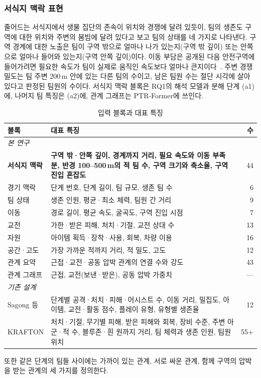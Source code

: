 \subsubsection{서식지 맥락 표현}
\label{sec:method:representation}
줄어드는 서식지에서 생물 집단의 존속이 위치와 경쟁에 달려 있듯이, 팀의 생존도 구역에 대한 위치와 주변의 붐빔에 달려 있다고 보고 팀의 상태를 네 가지로 나타낸다.
구역 경계에 대한 노출은 팀이 구역 밖으로 얼마나 나가 있는지(구역 밖 깊이) 또는 안쪽으로 얼마나 들어와 있는지(구역 안쪽 깊이)이다.
이동 부담은 공개된 다음 안전구역에 들어가려면 필요한 속도가 팀이 실제로 움직인 속도보다 얼마나 큰지이다~\cite{Nathan08}.
주변 경쟁 밀도는 팀 주변 200\,m 안에 있는 다른 팀의 수이고, 남은 팀원 수는 절단 시각에 살아 있다고 판정된 팀원의 수이다.
 서식지 맥락 블록은 RQ1의 해석 모델과 분해 단계 (a1)에, 나머지 팀 특징은 (a2)에, 관계 그래프는 PTR-Former에 쓰인다.

\begin{table}[t]
\centering
\caption{입력 블록과 대표 특징}
\label{tab:blocks}
\footnotesize
\setlength{\tabcolsep}{3pt}
\renewcommand{\arraystretch}{1.0}
\begin{tabular}{p{1.8cm}p{5.4cm}r}
\hline
블록 & 대표 특징 & 수 \\
\hline
\multicolumn{3}{l}{\emph{본 연구}} \\
\textbf{서식지 맥락} & \textbf{구역 밖·안쪽 깊이, 경계까지 거리, 필요 속도와 이동 부족분, 반경 100--500\,m의 적 팀 수, 구역 크기와 축소율, 구역 진입 혼잡도} & 44 \\
경기 맥락 & 단계 번호, 단계 길이, 팀 규모, 생존 팀 수 & 6 \\
팀 상태 & 생존 인원, 평균·최소 체력, 팀원 간 거리 & 9 \\
이동 & 경로 길이, 평균 속도, 굴곡도, 구역 진입 시점 & 7 \\
교전 & 가한·받은 피해, 처치·기절, 교전 상대 수 & 13 \\
자원 & 아이템 획득·장착·사용, 회복, 차량 이용 & 16 \\
공간·고도 & 가장 가까운 적까지 거리, 적 밀도, 고도 & 12 \\
관계 요약 & 근접·교전·공동 압박 관계의 연결 수와 강도 & 43 \\
관계 그래프 & 근접, 교전(보낸·받은), 공동 압박 가중치 & --- \\
\hline
\multicolumn{3}{l}{\emph{기존 설계}} \\
Sagong 등 & 단계별 공격·처치·피해·어시스트 수, 이동 거리, 밀집도, 아이템, 교전·활동 점수, 플레이 유형, 유형별 생존율 & 12 \\
KRAFTON & 처치·기절, 무기별 피해, 받은 피해와 회복, 장비 수준, 주변 아군·적 수, 블루존·흰 원까지 거리, 팀 체력과 생존 인원, 팀원 위치 & 55+ \\
\hline
\end{tabular}
\end{table}
또한 같은 단계의 팀들 사이에는 가까이 있는 관계, 서로 싸운 관계, 함께 구역의 압박을 받는 관계의 세 가지를 정의한다.

